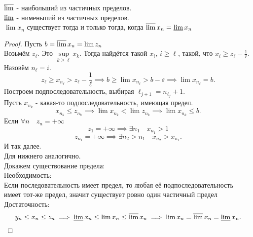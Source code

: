 \documentclass[11pt, oneside]{article}   	%
\begin{document}
    \begin{theorem}
        $\varlimsup$ - наибольший из частичных пределов.\\
        $\varliminf$ - нименьший из частичных пределов.\\
        $\lim x_n$ существует тогда и только тогда, когда  $\varlimsup x_n = \varliminf x_n$ \\
        \begin{proof}
            Пусть $b = \varlimsup x_n = \lim z_n$ \\
            Возьмём $z_\ell$. Это  $\sup\limits_{k\ge \ell} x_k$. Тогда найдётся такой $x_i$, $i\ge \ell$, такой, что  $x_i \ge z_{\ell} - \frac{1}{\ell}$.\\
            Назовём $n_{\ell} = i$.\\
            \[ z_{\ell} \ge x_{n_\ell} > z_{\ell}-\frac{1}{\ell} \implies b \ge \lim x_{n_\ell} >b-\varepsilon \implies \lim x_{n_\ell} = b.\]
            Построем подпоследовательность, выбирая $\ell_{j+1} = n_{\ell_j} + 1$.\\
            Пусть $x_{n_k}$ - какая-то подпоследовательность, имеющая предел.\\
            \[ x_{n_k} \le z_{n_k} \implies \lim x_{n_k} < \lim z_{n_k} \implies \lim x_{n_k} \le  b .\]
            Если $\forall{n}\quad z_n = +\infty$
            \[z_1 = +\infty \implies \exists{n_1}\quad   x_{n_1} > 1\]
            \[ z_{n_1} =  +\infty \implies \exists{n_2 > n_1}\quad x_{n_2} > x_{n_1} .\]
            И так далее.\\
            Для нижнего аналогично.\\
            Докажем существование предела:\\
            Необходимость:\\
            Если последовательность имеет предел, то любая её подпоследовательность имеет тот-же предел, значит существует ровно один частичный предел\\
            Достаточность:\\
            \[ y_n \le x_n \le z_n \implies \varliminf x_n \le \lim x_n \le \varlimsup x_n \implies \lim x_n = \varlimsup x_n = \varliminf x_n .\]
        \end{proof}
    \end{theorem}
\end{document}
